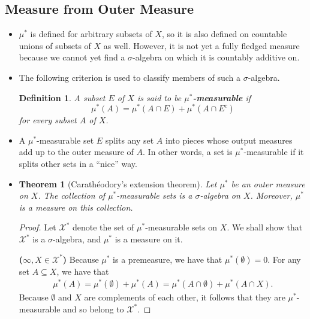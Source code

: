 \documentclass[10pt]{article}
\newtheorem{theorem}[lemma]{Theorem}
\newtheorem{definition}[lemma]{Definition}
\newcommand{\mcal}[1]{\mathcal{#1}}
\begin{document}
\subsection{Measure from Outer Measure}

\begin{itemize}
  \item $\mu^*$ is defined for arbitrary subsets of $X$, so it is also defined on countable unions of subsets of $X$ as well. However, it is not yet a fully fledged measure because we cannot yet find a $\sigma$-algebra on which it is countably additive on.
  
  \item The following criterion is used to classify members of such a $\sigma$-algebra.
  
  \begin{definition}
    A subset $E$ of $X$ is said to be {\bf $\mu^*$-measurable} if
    $$ \mu^*(A) = \mu^*(A \cap E) + \mu^*(A \cap E^c) $$
    for every subset $A$ of $X$.
  \end{definition}

  \item A $\mu^*$-measurable set $E$ splits any set $A$ into pieces whose output measures add up to the outer measure of $A$. In other words, a set is $\mu^*$-measurable if it splits other sets in a ``nice'' way.
  
  \item \begin{theorem}[Carath\'{e}odory's extension theorem] \label{theorem:caratheodory} Let $\mu^*$ be an outer measure on $X$. The collection of $\mu^*$-measurable sets is a $\sigma$-algebra on $X$. Moreover, $\mu^*$ is a measure on this collection.
  \end{theorem}

  \begin{proof} Let $\mcal{X}^*$ denote the set of $\mu^*$-measurable sets on $X$. We shall show that $\mcal{X}^*$ is a $\sigma$-algebra, and $\mu^*$ is a measure on it.

    {\bf ($\infty, X \in \mcal{X}^*$)} Because $\mu^*$ is a premeasure, we have that $\mu^*(\emptyset) = 0$. For any set $A \subseteq X$, we have that
    \begin{align*}
      \mu^*(A) = \mu^*(\emptyset) + \mu^*(A) = \mu^*(A \cap \emptyset) + \mu^*(A \cap X).
    \end{align*}
    Because $\emptyset$ and $X$ are complements of each other, it follows that they are $\mu^*$-measurable and so belong to $\mcal{X}^*$.


\end{proof}
\end{itemize}
\end{document}

